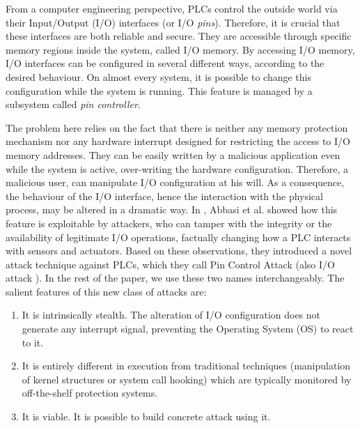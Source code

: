 From a computer engineering perspective, PLCs control the outside world via their Input/Output (I/O) interfaces (or I/O \emph{pins}).
Therefore, it is crucial that these interfaces are both reliable and secure. They are accessible through specific memory regions inside the system, called I/O memory.
By accessing I/O memory, I/O interfaces can be configured in several different ways, according to the desired behaviour.
On almost every system, it is possible to change this configuration while the system is running. This feature is managed by a subsystem called \emph{pin controller}.

The problem here relies on the fact that there is neither any memory protection mechanism nor any hardware interrupt designed for restricting the access to I/O memory addresses.
They can be easily written by a malicious application even while the system is active, over-writing the hardware configuration.
Therefore, a malicious user, can manipulate I/O configuration at his will.
As a consequence, the behaviour of the I/O interface, hence the interaction with the physical process, may be altered in a dramatic way.
In \cite{ghostplc}, Abbasi et al. showed how this feature is exploitable by attackers, who can tamper with
the integrity or the availability of legitimate I/O operations, factually changing how a PLC interacts with sensors and actuators.
Based on these observations, they introduced a novel attack technique against PLCs, which they call Pin Control Attack (also I/O attack \cite{tech-ghostplc}).
In the rest of the paper, we use these two names interchangeably. The salient features of this new class of attacks are:
\begin{enumerate}[itemsep=2pt,topsep=0pt]
	\item It is intrinsically stealth. The alteration of I/O configuration does not generate any interrupt signal, preventing the Operating System (OS) to react to it.
	\item It is entirely different in execution from traditional techniques (\eg manipulation of kernel structures or system call hooking) which are typically
		monitored by off-the-shelf protection systems.
	\item It is viable. It is possible to build concrete attack using it.
\end{enumerate}

